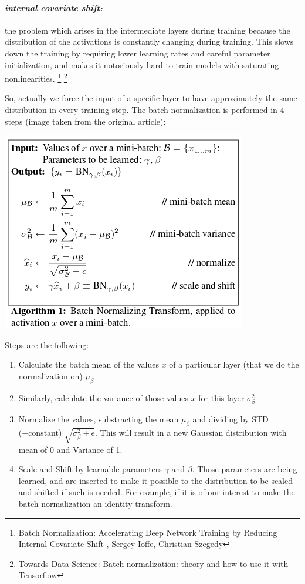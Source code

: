 \documentclass[a4paper]{iacas}
\begin{document}
\paragraph{\textit{internal covariate shift:}}
the problem which arises in the intermediate layers during training because the distribution of the activations is constantly changing during training. This slows down the training by requiring lower learning rates and careful parameter initialization, and makes it notoriously hard to train models with saturating nonlinearities. \footnote{Batch Normalization: Accelerating Deep Network Training by Reducing Internal Covariate Shift , Sergey Ioffe, Christian Szegedy} \footnote{Towards Data Science: Batch normalization: theory and how to use it with Tensorflow}
\newline

So, actually we force the input of a specific layer to have approximately the same distribution in every training step. The batch normalization is performed in 4 steps (image taken from the original article):

\vskip 0.1in
\includegraphics[scale=0.6]{imgs/batch_norm.PNG}
\vskip 0.1in

Steps are the following:
\begin{enumerate}
\item Calculate the batch mean of the values $x$ of a particular layer (that we do the normalization on) $\mu_{\beta}$
\item Similarly, calculate the variance of those values $x$ for this layer $\sigma_{\beta}^{2}$
\item Normalize the values, substracting the mean $\mu_{\beta}$ and dividing by STD (+constant) $\sqrt{\sigma_{\beta}^{2} + \epsilon}$. This will result in a new Gaussian distribution with mean of 0 and Variance of 1. 
\item Scale and Shift by learnable parameters $\gamma$ and $\beta$. Those parameters are being learned, and are inserted to make it possible to the distribution to be scaled and shifted if such is needed. For example, if it is of our interest to make the batch normalization an identity transform. 
\end{enumerate}
\end{document}
